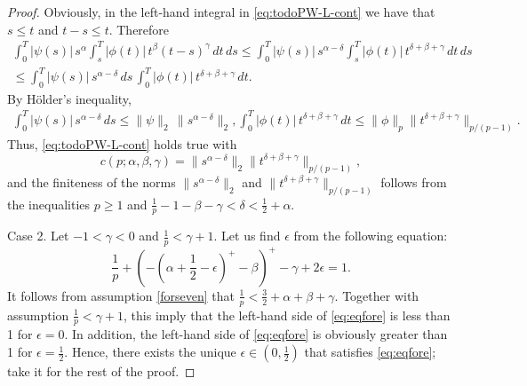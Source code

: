 \documentclass{article}
\theoremstyle{plain}
\theoremstyle{remark}
\theoremstyle{definition}
\begin{document}
\begin{proof}
	Obviously, in the  left-hand integral  in \eqref{eq:todoPW-L-cont} we have that
	$s\mathbin{\le}t$ and $t-s\mathbin{\le} t$.
	Therefore
	\begin{equation*}\begin{gathered}
	    \int_0^T |\psi(s)|\, s^\alpha
		\int_s^T |\phi(t)|\, t^\beta (t-s)^\gamma
		\, dt \, ds
		\le  \int_0^T |\psi(s)|\, s^{\alpha-\delta}
			\int_s^T |\phi(t)|\, t^{\delta+\beta+\gamma}
			\, dt \, ds
			\\ \le
			\int_0^T |\psi(s)|\, s^{\alpha-\delta} \, ds \,
			\int_0^T |\phi(t)|\, t^{\delta+\beta+\gamma} \, dt .
		 \end{gathered}\end{equation*}
	By H\"older's inequality,
	\begin{gather*}
		\int_0^T |\psi(s)|\, s^{\alpha-\delta} \, ds \le
		\|\psi\|_2 \, \|s^{\alpha-\delta}\|_2,
		 \int_0^T |\phi(t)|\, t^{\delta+\beta+\gamma} \, dt \le
		\|\phi\|_p \|t^{\delta+\beta+\gamma}\|_{p/(p-1)} .
	\end{gather*}
	Thus, \eqref{eq:todoPW-L-cont} holds true with
	\[
		c(p;\alpha,\beta,\gamma) =
		\|s^{\alpha-\delta}\|_2
		\|t^{\delta+\beta+\gamma}\|_{p/(p-1)},
	\]
	and the finiteness
	of the norms $\|s^{\alpha-\delta}\|_2$ and
	$\|t^{\delta+\beta+\gamma}\|_{p/(p-1)}$
	follows from the inequalities $p\ge 1$ and
	$\frac1p - 1 - \beta - \gamma < \delta < \frac12+\alpha$.

	 Case 2. Let $-1 < \gamma < 0$ and
$\frac{1}{p} < \gamma+1$.
	Let us find $\epsilon$ from the following equation:
	\begin{equation}
		\label{eq:eqfore}
		\frac{1}{p}
		+ \left( - \left( \alpha + {\textstyle\frac12} - \epsilon\right)^+
		  - \beta\right)^+
		- \gamma + 2\epsilon = 1 .
	\end{equation}
	It follows from assumption \eqref{forseven} that
	$\frac{1}{p} < \frac32 + \alpha + \beta + \gamma$.
  Together with assumption $\frac{1}{p} <
\gamma + 1$, this imply that
	the left-hand side of \eqref{eq:eqfore}
	is less than 1 for $\epsilon=0$. In addition, the left-hand side of \eqref{eq:eqfore}  is obviously     greater than 1 for $\epsilon=\frac12$.
	Hence, there exists the unique $\epsilon\in(0,\frac12)$ that satisfies
	\eqref{eq:eqfore}; take it for the rest of the proof.


\end{proof}
\end{document}
